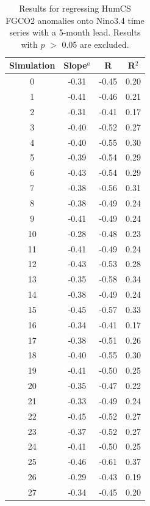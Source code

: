 \documentclass[12pt]{article}
\begin{document}
\clearpage
\begin{table}
	\centering
\caption{Results for regressing HumCS FGCO2 anomalies onto Nino3.4 time series with a 5-month lead. Results with $p$ $>$ 0.05 are excluded.}	
\begin{tabular}{c c c c}
	\toprule
	\textbf{Simulation} &  \textbf{Slope}$^{a}$  &  \textbf{R} &  \textbf{R$^{2}$} \\
	\midrule
	0  &  -0.31 &    -0.45 &       0.20 \\
	1  &  -0.41 &    -0.46 &       0.21 \\
	2  &  -0.31 &    -0.41 &       0.17 \\
	3  &  -0.40 &    -0.52 &       0.27 \\
	4  &  -0.40 &    -0.55 &       0.30 \\
	5  &  -0.39 &    -0.54 &       0.29 \\
	6  &  -0.43 &    -0.54 &       0.29 \\
	7  &  -0.38 &    -0.56 &       0.31 \\
	8  &  -0.38 &    -0.49 &       0.24 \\
	9  &  -0.41 &    -0.49 &       0.24 \\
	10 &  -0.28 &    -0.48 &       0.23 \\
	11 &  -0.41 &    -0.49 &       0.24 \\
	12 &  -0.43 &    -0.53 &       0.28 \\
	13 &  -0.35 &    -0.58 &       0.34 \\
	14 &  -0.38 &    -0.49 &       0.24 \\
	15 &  -0.45 &    -0.57 &       0.33 \\
	16 &  -0.34 &    -0.41 &       0.17 \\
	17 &  -0.38 &    -0.51 &       0.26 \\
	18 &  -0.40 &    -0.55 &       0.30 \\
	19 &  -0.41 &    -0.50 &       0.25 \\
	20 &  -0.35 &    -0.47 &       0.22 \\
	21 &  -0.33 &    -0.49 &       0.24 \\
	22 &  -0.45 &    -0.52 &       0.27 \\
	23 &  -0.37 &    -0.52 &       0.27 \\
	24 &  -0.41 &    -0.50 &       0.25 \\
	25 &  -0.46 &    -0.61 &       0.37 \\
	26 &  -0.29 &    -0.43 &       0.19 \\
	27 &  -0.34 &    -0.45 &       0.20 \\

\end{tabular}
\end{table}
\end{document}
